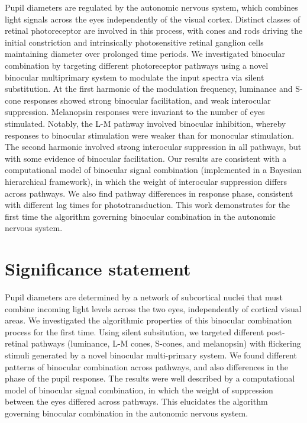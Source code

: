 \documentclass[
]{article}
\begin{document}
Pupil diameters are regulated by the autonomic nervous system, which combines light signals across the eyes independently of the visual cortex. Distinct classes of retinal photoreceptor are involved in this process, with cones and rods driving the initial constriction and intrinsically photosensitive retinal ganglion cells maintaining diameter over prolonged time periods. We investigated binocular combination by targeting different photoreceptor pathways using a novel binocular multiprimary system to modulate the input spectra via silent substitution. At the first harmonic of the modulation frequency, luminance and S-cone responses showed strong binocular facilitation, and weak interocular suppression. Melanopsin responses were invariant to the number of eyes stimulated. Notably, the L-M pathway involved binocular inhibition, whereby responses to binocular stimulation were weaker than for monocular stimulation. The second harmonic involved strong interocular suppression in all pathways, but with some evidence of binocular facilitation. Our results are consistent with a computational model of binocular signal combination (implemented in a Bayesian hierarchical framework), in which the weight of interocular suppression differs across pathways. We also find pathway differences in response phase, consistent with different lag times for phototransduction. This work demonstrates for the first time the algorithm governing binocular combination in the autonomic nervous system.

\hypertarget{significance-statement}{%
\section{Significance statement}\label{significance-statement}}

Pupil diameters are determined by a network of subcortical nuclei that must combine incoming light levels across the two eyes, independently of cortical visual areas. We investigated the algorithmic properties of this binocular combination process for the first time. Using silent subsitution, we targeted different post-retinal pathways (luminance, L-M cones, S-cones, and melanopsin) with flickering stimuli generated by a novel binocular multi-primary system. We found different patterns of binocular combination across pathways, and also differences in the phase of the pupil response. The results were well described by a computational model of binocular signal combination, in which the weight of suppression between the eyes differed across pathways. This elucidates the algorithm governing binocular combination in the autonomic nervous system.
\end{document}
